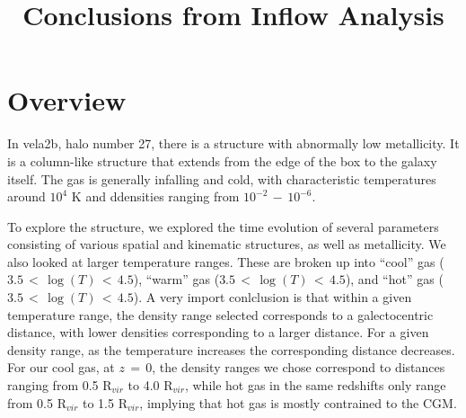 \documentclass{article}
\title{Conclusions from Inflow Analysis}
\begin{document}
\maketitle



\section{Overview}

In vela2b, halo number 27, there is a structure with abnormally low
metallicity.  It is a column-like structure that extends from the edge of the 
box to the galaxy itself. The gas is generally infalling and cold, with  
characteristic temperatures around $10^4$ K and ddensities ranging from 
$10^{-2}\,-\,10^{-6}$.


To explore the structure, we explored the time evolution of several parameters
consisting of various spatial and kinematic structures, as well as metallicity.
We also looked at larger temperature ranges. These are broken up into ``cool''
gas ($3.5\,<\,\log(T)\,<\,4.5$), ``warm'' gas ($3.5\,<\,\log(T)\,<\,4.5$), and
``hot'' gas ($3.5\,<\,\log(T)\,<\,4.5$). A very import conlclusion is that
within a given temperature range, the density range selected corresponds to a
galectocentric distance, with lower densities corresponding to a larger
distance. For a given density range, as the temperature increases the
corresponding distance decreases. For our cool gas, at $z\,=\,0$, the density
ranges we chose correspond to distances ranging from 0.5 R$_{vir}$ to 4.0
R$_{vir}$, while hot gas in the same redshifts only range from 0.5 R$_{vir}$
to 1.5 R$_{vir}$, implying that hot gas is mostly contrained to the CGM. 
\end{document}
